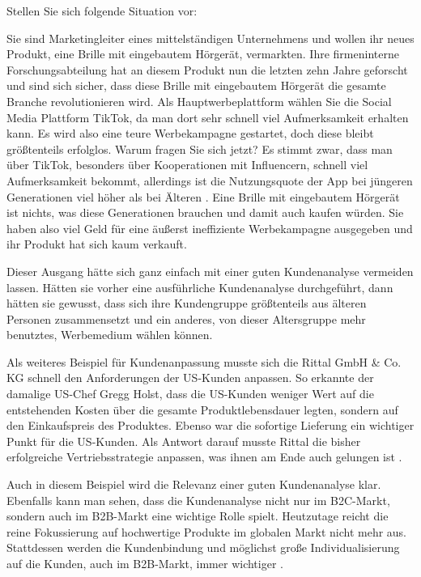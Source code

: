 \begin{refsection}
  
  
  Stellen Sie sich folgende Situation vor:

  Sie sind Marketingleiter eines mittelständigen Unternehmens und wollen ihr neues Produkt, eine Brille mit eingebautem Hörgerät, vermarkten. Ihre firmeninterne Forschungsabteilung hat an diesem Produkt nun die letzten zehn Jahre geforscht und sind sich sicher, dass diese Brille mit eingebautem Hörgerät die gesamte Branche revolutionieren wird. Als Hauptwerbeplattform wählen Sie die Social Media Plattform TikTok, da man dort sehr schnell viel Aufmerksamkeit erhalten kann. Es wird also eine teure Werbekampagne gestartet, doch diese bleibt grö\ss{}tenteils erfolglos. Warum fragen Sie sich jetzt? Es stimmt zwar, dass man über TikTok, besonders über Kooperationen mit Influencern, schnell viel Aufmerksamkeit bekommt, allerdings ist die Nutzungsquote der App bei jüngeren Generationen viel höher als bei Älteren \autocite{Statista1, Statista2}. Eine Brille mit eingebautem Hörgerät ist nichts, was diese Generationen brauchen und damit auch kaufen würden. Sie haben also viel Geld für eine äu\ss{}erst ineffiziente Werbekampagne ausgegeben und ihr Produkt hat sich kaum verkauft.

  Dieser Ausgang hätte sich ganz einfach mit einer guten Kundenanalyse vermeiden lassen. Hätten sie vorher eine ausführliche Kundenanalyse durchgeführt, dann hätten sie gewusst, dass sich ihre Kundengruppe grö\ss{}tenteils aus älteren Personen zusammensetzt und ein anderes, von dieser Altersgruppe mehr benutztes, Werbemedium wählen können.

  Als weiteres Beispiel für Kundenanpassung musste sich die Rittal GmbH \& Co. KG schnell den Anforderungen der US-Kunden anpassen. So erkannte der damalige US-Chef Gregg Holst, dass die US-Kunden weniger Wert auf die entstehenden Kosten über die gesamte Produktlebensdauer legten, sondern auf den Einkaufspreis des Produktes. Ebenso war die sofortige Lieferung ein wichtiger Punkt für die US-Kunden. Als Antwort darauf musste Rittal die bisher erfolgreiche Vertriebsstrategie anpassen, was ihnen am Ende auch gelungen ist \autocite[66]{Scheed2021}. 

  Auch in diesem Beispiel wird die Relevanz einer guten Kundenanalyse klar. Ebenfalls kann man sehen, dass die Kundenanalyse nicht nur im B2C-Markt, sondern auch im B2B-Markt eine wichtige Rolle spielt. Heutzutage reicht die reine Fokussierung auf hochwertige Produkte im globalen Markt nicht mehr aus. Stattdessen werden die Kundenbindung und möglichst gro\ss{}e Individualisierung auf die Kunden, auch im B2B-Markt, immer wichtiger \autocite[66]{Scheed2021}. 

  \clearpage
  \printbibliography[heading=subsubbibliography]
\end{refsection}
\clearpage
